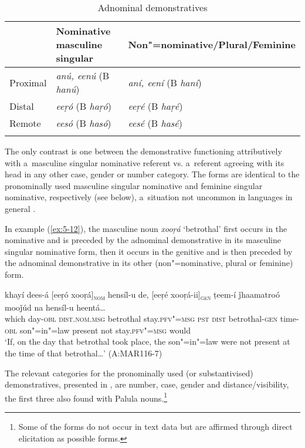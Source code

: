 \begin{table}[ht]
\caption{Adnominal demonstratives}
\begin{tabularx}{\textwidth}{ l@{\hspace{30pt}} Q Q }
\lsptoprule
&
Nominative masculine singular &
Non"=nominative/{\allowbreak}Plural/{\allowbreak}Feminine\\\hline
Proximal &
\textit{anú, eenú} (B \textit{hanú}) &
\textit{aní, eení} (B \textit{haní})\\
Distal &
\textit{eeṛó} (B \textit{haṛó}) &
\textit{eeṛé} (B \textit{haṛé})\\
Remote &
\textit{eesó} (B \textit{hasó}) &
\textit{eesé} (B \textit{hasé})\\\lspbottomrule
\end{tabularx}
\label{tab:5-3}
\end{table}

The only contrast is one between the demonstrative functioning attributively with a~masculine singular nominative referent vs. a~referent agreeing with its head in any other case, gender or number category. The forms are identical to the pronominally used masculine singular nominative and feminine singular nominative, respectively (see below), a~situation not uncommon in languages in general \citep[214]{himmelmann1996}. 


In example (\ref{ex:5-12}), the masculine noun \textit{xooṛá} `betrothal' first occurs in the nominative and is preceded by the adnominal demonstrative in its masculine singular nominative form, then it occurs in the genitive and is then preceded by the adnominal demonstrative in its other (non"=nominative, plural or feminine) form.


\begin{exe}
\ex
\label{ex:5-12}
\gll khayí dees-á [eeṛó xooṛá]\textsc{\textsubscript{nom}} hensíl-u de, [eeṛé
 xooṛá-ii]\textsc{\textsubscript{gen}} ṭeem-í ǰhaamatroó mooǰúd na hensíl-u
heentá{\dots} \\
which day-\textsc{obl} \textsc{dist.nom.msg} betrothal stay.\textsc{pfv"=msg} \textsc{pst}
\textsc{dist} betrothal-\textsc{gen} time-\textsc{obl} son"=in"=law present not stay.\textsc{pfv"=msg} would\\
\glt `If, on the day that betrothal took place, the son"=in"=law were not present at the time of that betrothal{\ldots}' (A:MAR116-7)
\end{exe}

The relevant categories for the pronominally used (or substantivised) demonstratives, presented in
, are number, case, gender and distance/visibility, the first three also found with Palula nouns.\footnote{Some of the forms do not occur in text data but are affirmed through direct elicitation as possible forms.}


